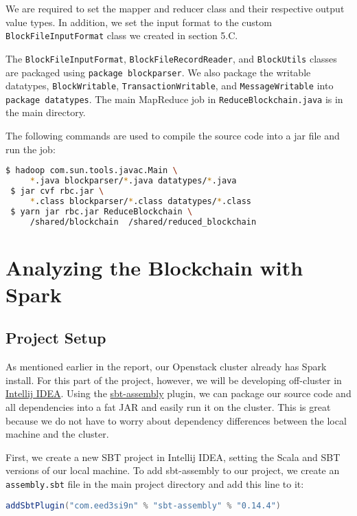 \documentclass[9pt,twocolumn,twoside]{idsi}
\begin{document}
We are required to set the mapper and reducer class and their respective output value types. In addition, we set the input format to the custom \lstinline{BlockFileInputFormat} class we created in section 5.C.

The \lstinline{BlockFileInputFormat}, \lstinline{BlockFileRecordReader}, and \lstinline{BlockUtils} classes are packaged using \lstinline{package blockparser}. We also package the writable datatypes, \lstinline{BlockWritable}, \lstinline{TransactionWritable}, and \lstinline{MessageWritable} into \lstinline{package datatypes}. The main MapReduce job in \lstinline{ReduceBlockchain.java} is in the main directory.

The following commands are used to compile the source code into a jar file and run the job:

\begin{lstlisting}[language=bash]
 $ hadoop com.sun.tools.javac.Main \
     *.java blockparser/*.java datatypes/*.java
 $ jar cvf rbc.jar \
     *.class blockparser/*.class datatypes/*.class
 $ yarn jar rbc.jar ReduceBlockchain \
     /shared/blockchain  /shared/reduced_blockchain
\end{lstlisting}

\section{Analyzing the Blockchain with Spark}
\subsection{Project Setup}
As mentioned earlier in the report, our Openstack cluster already has Spark install. For this part of the project, however, we will be developing off-cluster in \href{https://www.jetbrains.com/idea/}{Intellij IDEA}. Using the \href{https://github.com/sbt/sbt-assembly}{sbt-assembly} plugin, we can package our source code and all dependencies into a fat JAR and easily run it on the cluster. This is great because we do not have to worry about dependency differences between the local machine and the cluster.

First, we create a new SBT project in Intellij IDEA, setting the Scala and SBT versions of our local machine. To add sbt-assembly to our project, we create an \lstinline{assembly.sbt} file in the main project directory and add this line to it:

\begin{lstlisting}[language=Scala]
addSbtPlugin("com.eed3si9n" % "sbt-assembly" % "0.14.4")
\end{lstlisting}
\end{document}

